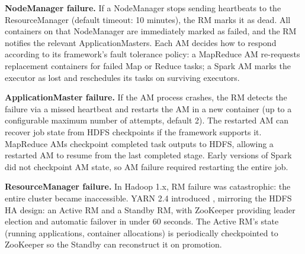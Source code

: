 \textbf{NodeManager failure.} If a NodeManager stops sending heartbeats
to the ResourceManager (default timeout: 10 minutes), the RM marks it
as dead. All containers on that NodeManager are immediately marked as
failed, and the RM notifies the relevant ApplicationMasters. Each AM
decides how to respond according to its framework's fault tolerance
policy: a MapReduce AM re-requests replacement containers for failed Map
or Reduce tasks; a Spark AM marks the executor as lost and reschedules
its tasks on surviving executors.

\textbf{ApplicationMaster failure.} If the AM process crashes, the RM
detects the failure via a missed heartbeat and restarts the AM in a
new container (up to a configurable maximum number of attempts, default
2). The restarted AM can recover job state from HDFS checkpoints if the
framework supports it. MapReduce AMs checkpoint completed task outputs
to HDFS, allowing a restarted AM to resume from the last completed
stage. Early versions of Spark did not checkpoint AM state, so AM
failure required restarting the entire job.

\textbf{ResourceManager failure.} In Hadoop 1.x, RM failure was
catastrophic: the entire cluster became inaccessible. YARN 2.4
introduced , mirroring the HDFS
HA design: an Active RM and a Standby RM, with ZooKeeper providing
leader election and automatic failover in under 60 seconds. The Active
RM's state (running applications, container allocations) is periodically
checkpointed to ZooKeeper so the Standby can reconstruct it on promotion.


